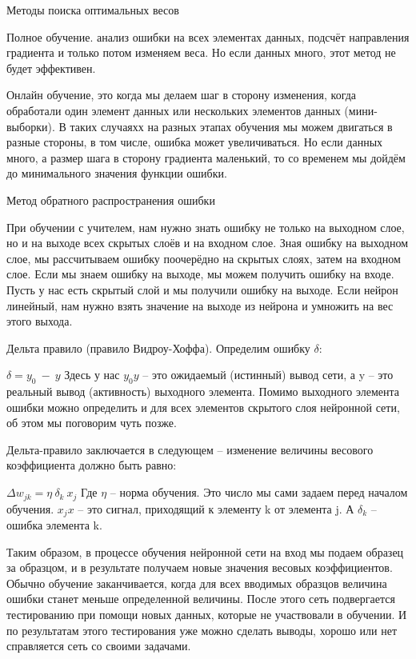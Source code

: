 \documentclass[12pt,a4paper]{report}
\begin{document}
 Методы поиска оптимальных весов 

Полное обучение. анализ ошибки на всех элементах данных, подсчёт направления градиента и только потом изменяем веса. Но если данных много, этот метод не будет эффективен.  

Онлайн обучение, это когда мы делаем шаг в сторону изменения, когда обработали один элемент данных или нескольких элементов данных (мини-выборки). В таких случаяхх на разных этапах обучения мы можем двигаться в разные стороны, в том числе, ошибка может увеличиваться. Но если данных много, а размер шага в сторону градиента маленький, то со временем мы дойдём до минимального значения функции ошибки. 

 Метод обратного распространения ошибки 

При обучении с учителем, нам нужно знать ошибку не только на выходном слое, но и на выходе всех скрытых слоёв и на входном слое. Зная ошибку на выходном слое, мы рассчитываем ошибку поочерёдно на скрытых слоях, затем на входном слое. Если мы знаем ошибку на выходе, мы можем получить ошибку на входе. Пусть у нас есть скрытый слой и мы получили ошибку на выходе. Если нейрон линейный, нам нужно взять значение на выходе из нейрона и умножить на вес этого выхода.  

Дельта правило (правило Видроу-Хоффа).
Определим ошибку $\delta$:

$\delta = y_0\medspace-\medspace y$
Здесь у нас $y_0y$ – это ожидаемый (истинный) вывод сети, а y – это реальный вывод (активность) выходного элемента. Помимо выходного элемента ошибки можно определить и для всех элементов скрытого слоя нейронной сети, об этом мы поговорим чуть позже.

Дельта-правило заключается в следующем – изменение величины весового коэффициента должно быть равно:

$\Delta w_{jk} = \eta\medspace\delta_k\medspace x_j$
Где $\eta$ – норма обучения. Это число мы сами задаем перед началом обучения. $x_jx$ – это сигнал, приходящий к элементу k от элемента j. А $\delta_k$ – ошибка элемента k.

Таким образом, в процессе обучения нейронной сети на вход мы подаем образец за образцом, и в результате получаем новые значения весовых коэффициентов. Обычно обучение заканчивается, когда для всех вводимых образцов величина ошибки станет меньше определенной величины. После этого сеть подвергается тестированию при помощи новых данных, которые не участвовали в обучении. И по результатам этого тестирования уже можно сделать выводы, хорошо или нет справляется сеть со своими задачами.
\end{document}
